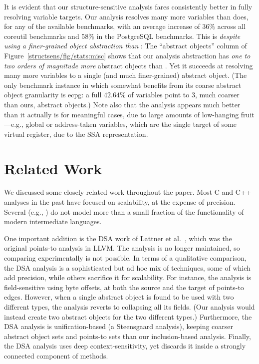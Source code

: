 It is evident that our structure-sensitive analysis fares consistently
better in fully resolving variable targets. Our analysis resolves many
more variables than \pearce{} does, for any of the available
benchmarks, with an average increase of $36\%$ across all coreutil
benchmarks and $58\%$ in the PostgreSQL benchmarks.  This is
\emph{despite using a finer-grained object abstraction than
  \pearce{}}: The ``abstract objects'' column of
Figure~\ref{structsens/fig/stats:misc} shows that our analysis
abstraction has \emph{one to two orders of magnitude more} abstract
objects than \pearce{}. Yet it succeeds at resolving many more
variables to a single (and much finer-grained) abstract object. (The
only benchmark instance in which \pearce{} somewhat benefits from its
coarse abstract object granularity is ecpg: a full $42.64\%$ of
variables point to 3, much coarser than ours, abstract objects.) Note
also that the \pearce{} analysis appears much better than it actually
is for meaningful cases, due to large amounts of low-hanging
fruit---e.g., global or address-taken variables, which are the single
target of some virtual register, due to the SSA representation.



\section{Related Work}

We discussed some closely related work throughout the paper. Most C
and C++ analyses in the past have focused on scalability, at the
expense of precision. Several (e.g.,
\cite{antgrasshopper,popl/ZhengR08,popl/Lhotak11}) do not model more
than a small fraction of the functionality of modern intermediate
languages.

One important addition is the DSA work of Lattner et
al.~\cite{pldi/LattnerLA07}, which was the original points-to analysis
in LLVM. The analysis is no longer maintained, so comparing
experimentally is not possible. In terms of a qualitative comparison,
the DSA analysis is a sophisticated but ad hoc mix of techniques, some
of which add precision, while others sacrifice it for scalability. For
instance, the analysis is field-sensitive using byte offsets, at both
the source and the target of points-to edges. However, when a single
abstract object is found to be used with two different types, the
analysis reverts to collapsing all its fields. (Our analysis would
instead create two abstract objects for the two different types.)
Furthermore, the DSA analysis is unification-based (a Steensgaard
analysis), keeping coarser abstract object sets and points-to sets
than our inclusion-based analysis. Finally, the DSA analysis uses deep
context-sensitivity, yet discards it inside a strongly connected
component of methods.

